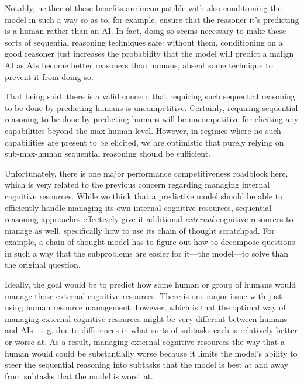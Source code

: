 {Notably, neither of these benefits are incompatible with also conditioning the model in such a way so as to, for example, ensure that the reasoner it's predicting is a human rather than an AI. In fact, doing so seems necessary to make these sorts of sequential reasoning techniques safe: without them, conditioning on a good reasoner just increases the probability that the model will predict a malign AI as AIs become better reasoners than humans, absent some technique to prevent it from doing so.

That being said, there is a valid concern that requiring such sequential reasoning to be done by predicting humans is uncompetitive. Certainly, requiring sequential reasoning to be done by predicting humans will be uncompetitive for eliciting any capabilities beyond the max human level. However, in regimes where no such capabilities are present to be elicited, we are optimistic that purely relying on sub-max-human sequential reasoning should be sufficient.

Unfortunately, there is one major performance competitiveness roadblock here, which is very related to the previous concern regarding managing internal cognitive resources. While we think that a predictive model should be able to efficiently handle managing its own internal cognitive resources, sequential reasoning approaches effectively give it additional \textit{external} cognitive resources to manage as well, specifically how to use its chain of thought scratchpad. For example, a chain of thought model has to figure out how to decompose questions in such a way that the subproblems are easier for it---the model---to solve than the original question.

Ideally, the goal would be to predict how some human or group of humans would manage those external cognitive resources. There is one major issue with just using human resource management, however, which is that the optimal way of managing external cognitive resources might be very different between humans and AIs---e.g. due to differences in what sorts of subtasks each is relatively better or worse at. As a result, managing external cognitive resources the way that a human would could be substantially worse because it limits the model's ability to steer the sequential reasoning into subtasks that the model is best at and away from subtasks that the model is worst at.

}
